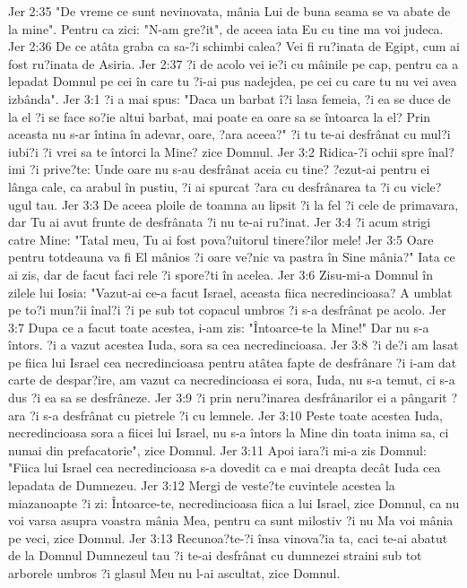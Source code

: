 Jer 2:35  "De vreme ce sunt nevinovata, mânia Lui de buna seama se va abate de la mine". Pentru ca zici: "N-am gre?it", de aceea iata Eu cu tine ma voi judeca.
Jer 2:36  De ce atâta graba ca sa-?i schimbi calea? Vei fi ru?inata de Egipt, cum ai fost ru?inata de Asiria.
Jer 2:37  ?i de acolo vei ie?i cu mâinile pe cap, pentru ca a lepadat Domnul pe cei în care tu ?i-ai pus nadejdea, pe cei cu care tu nu vei avea izbânda".
Jer 3:1  ?i a mai spus: "Daca un barbat î?i lasa femeia, ?i ea se duce de la el ?i se face so?ie altui barbat, mai poate ea oare sa se întoarca la el? Prin aceasta nu s-ar întina în adevar, oare, ?ara aceea?" ?i tu te-ai desfrânat cu mul?i iubi?i ?i vrei sa te întorci la Mine? zice Domnul.
Jer 3:2  Ridica-?i ochii spre înal?imi ?i prive?te: Unde oare nu s-au desfrânat aceia cu tine? ?ezut-ai pentru ei lânga cale, ca arabul în pustiu, ?i ai spurcat ?ara cu desfrânarea ta ?i cu vicle?ugul tau.
Jer 3:3  De aceea ploile de toamna au lipsit ?i la fel ?i cele de primavara, dar Tu ai avut frunte de desfrânata ?i nu te-ai ru?inat.
Jer 3:4  ?i acum strigi catre Mine: "Tatal meu, Tu ai fost pova?uitorul tinere?ilor mele!
Jer 3:5  Oare pentru totdeauna va fi El mânios ?i oare ve?nic va pastra în Sine mânia?" Iata ce ai zis, dar de facut faci rele ?i spore?ti în acelea.
Jer 3:6  Zisu-mi-a Domnul în zilele lui Iosia: "Vazut-ai ce-a facut Israel, aceasta fiica necredincioasa? A umblat pe to?i mun?ii înal?i ?i pe sub tot copacul umbros ?i s-a desfrânat pe acolo.
Jer 3:7  Dupa ce a facut toate acestea, i-am zis: "Întoarce-te la Mine!" Dar nu s-a întors. ?i a vazut acestea Iuda, sora sa cea necredincioasa.
Jer 3:8  ?i de?i am lasat pe fiica lui Israel cea necredincioasa pentru atâtea fapte de desfrânare ?i i-am dat carte de despar?ire, am vazut ca necredincioasa ei sora, Iuda, nu s-a temut, ci s-a dus ?i ea sa se desfrâneze.
Jer 3:9  ?i prin neru?inarea desfrânarilor ei a pângarit ?ara ?i s-a desfrânat cu pietrele ?i cu lemnele.
Jer 3:10  Peste toate acestea Iuda, necredincioasa sora a fiicei lui Israel, nu s-a întors la Mine din toata inima sa, ci numai din prefacatorie", zice Domnul.
Jer 3:11  Apoi iara?i mi-a zis Domnul: "Fiica lui Israel cea necredincioasa s-a dovedit ca e mai dreapta decât Iuda cea lepadata de Dumnezeu.
Jer 3:12  Mergi de veste?te cuvintele acestea la miazanoapte ?i zi: Întoarce-te, necredincioasa fiica a lui Israel, zice Domnul, ca nu voi varsa asupra voastra mânia Mea, pentru ca sunt milostiv ?i nu Ma voi mânia pe veci, zice Domnul.
Jer 3:13  Recunoa?te-?i însa vinova?ia ta, caci te-ai abatut de la Domnul Dumnezeul tau ?i te-ai desfrânat cu dumnezei straini sub tot arborele umbros ?i glasul Meu nu l-ai ascultat, zice Domnul.
